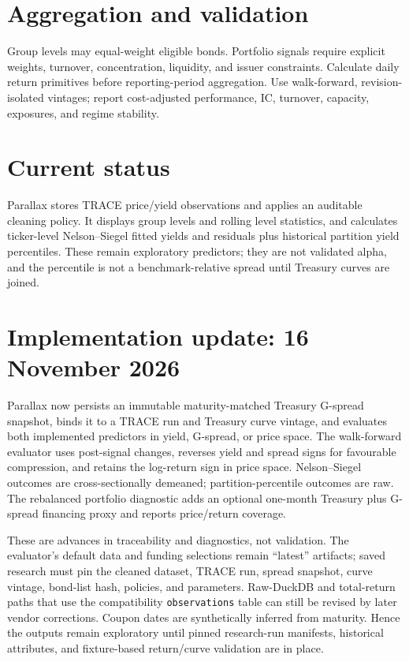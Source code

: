 \documentclass[11pt]{article}
\begin{document}
\section{Aggregation and validation}
Group levels may equal-weight eligible bonds. Portfolio signals require explicit weights, turnover, concentration, liquidity, and issuer constraints. Calculate daily return primitives before reporting-period aggregation. Use walk-forward, revision-isolated vintages; report cost-adjusted performance, IC, turnover, capacity, exposures, and regime stability.
\section{Current status}
Parallax stores TRACE price/yield observations and applies an auditable cleaning policy. It displays group levels and rolling level statistics, and calculates ticker-level Nelson--Siegel fitted yields and residuals plus historical partition yield percentiles. These remain exploratory predictors; they are not validated alpha, and the percentile is not a benchmark-relative spread until Treasury curves are joined.

\section{Implementation update: 16 November 2026}
Parallax now persists an immutable maturity-matched Treasury G-spread snapshot, binds it to a TRACE run and Treasury curve vintage, and evaluates both implemented predictors in yield, G-spread, or price space. The walk-forward evaluator uses post-signal changes, reverses yield and spread signs for favourable compression, and retains the log-return sign in price space. Nelson--Siegel outcomes are cross-sectionally demeaned; partition-percentile outcomes are raw. The rebalanced portfolio diagnostic adds an optional one-month Treasury plus G-spread financing proxy and reports price/return coverage.

These are advances in traceability and diagnostics, not validation. The evaluator's default data and funding selections remain ``latest'' artifacts; saved research must pin the cleaned dataset, TRACE run, spread snapshot, curve vintage, bond-list hash, policies, and parameters. Raw-DuckDB and total-return paths that use the compatibility \texttt{observations} table can still be revised by later vendor corrections. Coupon dates are synthetically inferred from maturity. Hence the outputs remain exploratory until pinned research-run manifests, historical attributes, and fixture-based return/curve validation are in place.
\end{document}
